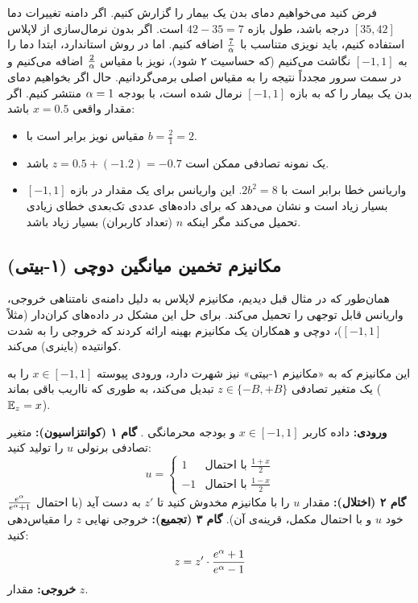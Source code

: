 \begin{مثال}
فرض کنید می‌خواهیم دمای بدن یک بیمار را گزارش کنیم. اگر دامنه تغییرات دما $[35, 42]$ درجه باشد، طول بازه $42-35=7$ است.
اگر بدون نرمال‌سازی از لاپلاس استفاده کنیم، باید نویزی متناسب با $\frac{7}{\alpha}$ اضافه کنیم.
اما در روش استاندارد، ابتدا دما را به $[-1, 1]$ نگاشت می‌کنیم (که حساسیت ۲ شود)، نویز با مقیاس $\frac{2}{\alpha}$ اضافه می‌کنیم و در سمت سرور مجدداً نتیجه را به مقیاس اصلی برمی‌گردانیم.
حال اگر بخواهیم دمای بدن یک بیمار را که به بازه $[-1, 1]$ نرمال شده است، با بودجه $\alpha=1$ منتشر کنیم. اگر مقدار واقعی $x=0.5$ باشد:
\begin{itemize}
    \item مقیاس نویز برابر است با $b = \frac{2}{1} = 2$.
    \item یک نمونه تصادفی ممکن است $z = 0.5 + (-1.2) = -0.7$ باشد.
    \item واریانس خطا برابر است با $2b^2 = 8$. این واریانس برای یک مقدار در بازه $[-1, 1]$ بسیار زیاد است و نشان می‌دهد که  برای داده‌های عددی تک‌بعدی خطای زیادی تحمیل می‌کند مگر اینکه $n$ (تعداد کاربران) بسیار زیاد باشد.
\end{itemize}
\end{مثال}
\subsection{مکانیزم تخمین میانگین دوچی (۱-بیتی)}
\label{sec:duchi-mechanism}

همان‌طور که در مثال قبل دیدیم، مکانیزم لاپلاس به دلیل دامنه‌ی نامتناهی خروجی، واریانس قابل توجهی را تحمیل می‌کند. برای حل این مشکل در داده‌های کران‌دار (مثلاً $[-1, 1]$)، دوچی و همکاران \cite{duchi2018} یک مکانیزم بهینه ارائه کردند که خروجی را به شدت کوانتیده (باینری) می‌کند.

این مکانیزم که به «مکانیزم ۱-بیتی» نیز شهرت دارد، ورودی پیوسته $x \in [-1, 1]$ را به یک متغیر تصادفی $z \in \{-B, +B\}$ تبدیل می‌کند، به طوری که نااریب باقی بماند ($\Eset[z]=x$).

\begin{algorithm}
\caption{مکانیزم ۱-بیتی دوچی}
\label{alg:duchi}
\begin{algorithmic}[1]
\State \textbf{ورودی:} داده کاربر $x \in [-1, 1]$ و بودجه محرمانگی \al.
\State \textbf{گام ۱ (کوانتزاسیون):} متغیر تصادفی برنولی $u$ را تولید کنید:
\begin{equation}
u = \begin{cases}
1 & \text{با احتمال } \frac{1+x}{2} \\
-1 & \text{با احتمال } \frac{1-x}{2}
\end{cases}
\end{equation}
\State \textbf{گام ۲ (اختلال):} مقدار $u$ را با مکانیزم  مخدوش کنید تا $z'$ به دست آید (با احتمال $\frac{e^{\alpha}}{e^{\alpha}+1}$ خود $u$ و با احتمال مکمل، قرینه‌ی آن).
\State \textbf{گام ۳ (تجمیع):} خروجی نهایی $z$ را مقیاس‌دهی کنید:
\begin{equation}
z = z' \cdot \frac{e^{\alpha}+1}{e^{\alpha}-1}
\end{equation}
\State \textbf{خروجی:} مقدار $z$.
\end{algorithmic}
\end{algorithm}

